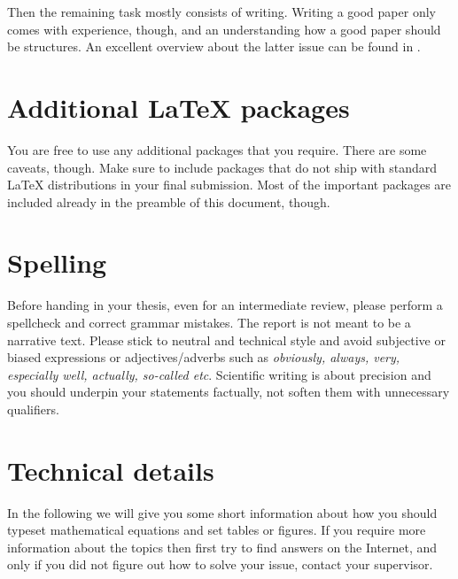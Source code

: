 \documentclass[10pt,a4paper,twoside,journal]{IEEEtran}
\begin{document}
Then the remaining task mostly consists of writing. Writing a good paper only
comes with experience, though, and an understanding how a good paper should be
structures. An excellent overview about the latter issue can be found in
\cite{katzoff1964}.

\section{Additional \LaTeX{} packages}

You are free to use any additional packages that you require. There are some
caveats, though. Make sure to include packages that do not ship with standard
\LaTeX{} distributions in your final submission. Most of the important packages
are included already in the preamble of this document, though.


\section{Spelling}

Before handing in your thesis, even for an intermediate review, please perform a
spellcheck and correct grammar mistakes. The report is not meant to be a
narrative text. Please stick to neutral and technical style and avoid subjective
or biased expressions or adjectives/adverbs such as \emph{obviously, always,
very, especially well, actually, so-called etc}. Scientific writing is about
precision and you should underpin your statements factually, not soften them
with unnecessary qualifiers.


\section{Technical details}

In the following we will give you some short information about how you should
typeset mathematical equations and set tables or figures. If you require more
information about the topics then first try to find answers on the Internet, and
only if you did not figure out how to solve your issue, contact your supervisor.
\end{document}
